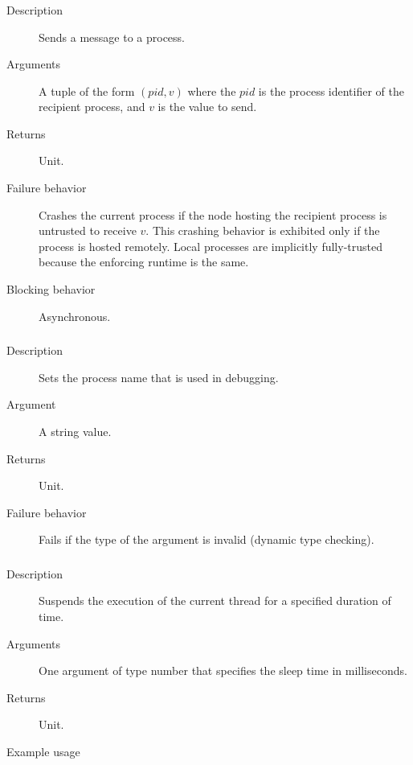 \subsubsection{}
\begin{description}
    \item [Description] Sends a message to a process.
    \item [Arguments] A tuple of the form $(\mathit{pid}, v)$ where the $\mathit{pid}$ is the process identifier 
of the recipient process, and $v$ is the value to send.
    \item [Returns] Unit.
    \item [Failure behavior] Crashes the current process if the node hosting the recipient process is untrusted to receive $v$.
This crashing behavior is exhibited only if the process is hosted remotely. Local processes are implicitly fully-trusted because the 
enforcing runtime is the same.
    \item [Blocking behavior] Asynchronous.
\end{description}


\subsubsection{}
\begin{description}
    \item [Description] Sets the process name that is used in debugging.
    \item [Argument] A string value.
    \item [Returns] Unit.
    \item [Failure behavior] Fails if the type of the argument is invalid (dynamic type checking).
\end{description}



\subsubsection{}

\begin{description}
    \item [Description] Suspends the execution of the current thread for a specified duration of time.  
    \item [Arguments] One argument of type number that specifies the sleep time in milliseconds.
    \item [Returns] Unit.
    \item [Example usage] 
\end{description}



